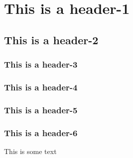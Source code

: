 \documentclass{article}
\begin{document}
\section*{\Huge This is a header-1}
\subsection*{\huge This is a header-2}
\subsubsection*{\LARGE This is a header-3}
\subsubsection*{\Large This is a header-4}
\subsubsection*{\large This is a header-5}
\subsubsection*{This is a header-6}
This is some text
\end{document}

